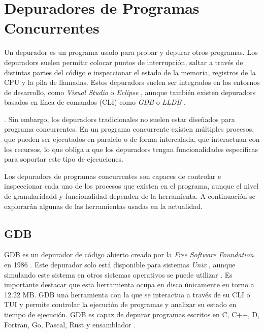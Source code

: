 \section{Depuradores de Programas Concurrentes}\label{sec:depuradores-programas-concurrentes}

Un \gls{depurador} \cite{WikipediaDebugger} es un programa usado para probar y \gls{depurar} otros programas. Los \glspl{depurador} suelen permitir colocar puntos de interrupción, saltar a través de distintas partes del código e inspeccionar el estado de la memoria, registros de la \gls{CPU} y la pila de llamadas.
Estos \glspl{depurador} suelen ser integrados en los entornos de desarrollo, como \textit{Visual Studio} \cite{DebuggerVisualStudio} o \textit{Eclipse} \cite{DebuggerEclipse}, aunque también existen \glspl{depurador} basados en línea de comandos (\gls{CLI}) como \textit{GDB} \cite{GDB} o \textit{LLDB} \cite{LLDB}. 

.
Sin embargo, los \glspl{depurador} tradicionales no suelen estar diseñados para \glspl {programa concurrente}. En un \gls{programa concurrente} \cite{ParallelismComputerArchitecture} existen múltiples \glspl{proceso}, que pueden ser ejecutados en paralelo o de forma intercalada, que interactuan con los recursos, lo que obliga a que los \glspl{depurador} tengan funcionalidades específicas para soportar este tipo de ejecuciones.

Los \glspl{depurador} de programas concurrentes son capaces de controlar e inspeccionar cada uno de los \glspl{proceso} que existen en el programa, aunque el nivel de granularidadd y funcionalidad dependen de la herramienta. A continuación se explorarán algunas de las herramientas usadas en la actualidad.

\subsection{GDB}{\label{subsec:gdb}}
GDB es un \gls{depurador} de código abierto creado por la \textit{Free Software Foundation} en 1986 \cite{GDB}. Este \gls{depurador} solo está disponible para sistemas \textit{Unix} \cite{UNIX} , aunque simulando este sistema en otros sistemas operativos se puede utilizar \cite{GDBDownload}. Es importante destacar que esta herramienta ocupa en disco únicamente en torno a 12.22 MB. 
GDB una herramienta con la que se interactua a través de su \gls{CLI} o \gls{TUI} y permite controlar la ejecución de programas y analizar su estado en tiempo de ejecución. GDB es capaz de depurar programas escritos en C, C++, D, Fortran, Go, Pascal, Rust y \gls{ensamblador} \cite{GDB}.  

